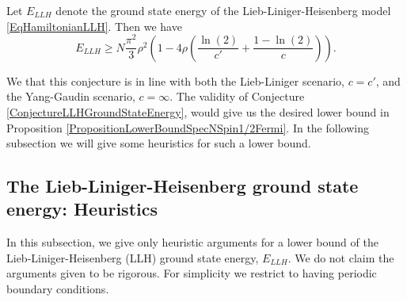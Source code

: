 \begin{conjecture}\label{ConjectureLLHGroundStateEnergy}
	Let $ E_{LLH} $ denote the ground state energy of the Lieb-Liniger-Heisenberg model \eqref{EqHamiltonianLLH}. Then we have \begin{equation}
	E_{LLH}\geq N\frac{\pi^2}{3}\rho^2\left(1-4\rho\left(\frac{\ln(2)}{c'}+\frac{1-\ln(2)}{c}\right) \right).
	\end{equation}
\end{conjecture}
We that this conjecture is in line with both the Lieb-Liniger scenario, $ c=c' $, and the Yang-Gaudin scenario, $ c=\infty $. The validity of Conjecture \ref{ConjectureLLHGroundStateEnergy}, would give us the desired lower bound in Proposition \ref{PropositionLowerBoundSpecNSpin1/2Fermi}.
In the following subsection we will give some heuristics for such a lower bound.
\subsection{The Lieb-Liniger-Heisenberg ground state energy: Heuristics}
In this subsection, we give only heuristic arguments for a lower bound of the Lieb-Liniger-Heisenberg (LLH) ground state energy, $ E_{LLH} $. We do not claim the arguments given to be rigorous. For simplicity we restrict to having periodic boundary conditions. 

